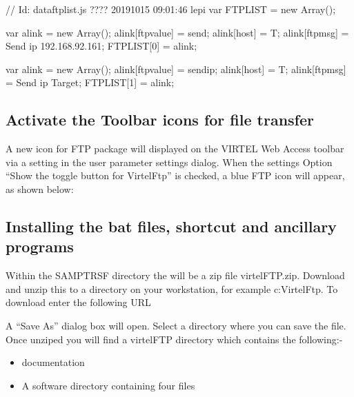 \documentclass[letterpaper,10pt,english]{sphinxmanual}
\begin{document}
\begin{sphinxVerbatim}[commandchars=\\\{\}]
// \PYGZdl{}Id: dataftplist.js ???? 2019\PYGZhy{}10\PYGZhy{}15 09:01:46 lepi \PYGZdl{}
var FTPLIST = new Array();

var alink = new Array();
alink[\PYGZdq{}ftpvalue\PYGZdq{}] = \PYGZdq{}send\PYGZdq{};
alink[\PYGZdq{}host\PYGZdq{}] = \PYGZdq{}T\PYGZdq{};
alink[\PYGZdq{}ftpmsg\PYGZdq{}] = \PYGZdq{}Send ip 192.168.92.161\PYGZdq{};
FTPLIST[0] = alink;

var alink = new Array();
alink[\PYGZdq{}ftpvalue\PYGZdq{}] = \PYGZdq{}sendip\PYGZdq{};
alink[\PYGZdq{}host\PYGZdq{}] = \PYGZdq{}T\PYGZdq{};
alink[\PYGZdq{}ftpmsg\PYGZdq{}] = \PYGZdq{}Send ip Target\PYGZdq{};
FTPLIST[1] = alink;
\end{sphinxVerbatim}


\subsection{Activate the Toolbar icons for file transfer}
\label{\detokenize{Customization:activate-the-toolbar-icons-for-file-transfer}}
A new icon for FTP package will displayed on the VIRTEL Web Access toolbar via a setting in the user parameter settings dialog. When the settings Option “Show the toggle button for VirtelFtp” is checked, a blue FTP icon will appear, as shown below:




\subsection{Installing the bat files, shortcut and ancillary programs}
\label{\detokenize{Customization:installing-the-bat-files-shortcut-and-ancillary-programs}}
Within the SAMPTRSF directory the will be a zip file virtelFTP.zip. Download and unzip this to a directory on your workstation, for example c:VirtelFtp. To download enter the following URL

\begin{sphinxVerbatim}[commandchars=\\\{\}]
\end{sphinxVerbatim}

A “Save As” dialog box will open. Select a directory where you can save the file. Once unziped you will find a virtelFTP directory which contains the following:-
\begin{itemize}
\item {} 
documentation

\item {} 
A software directory containing four files

\end{itemize}
\end{document}

